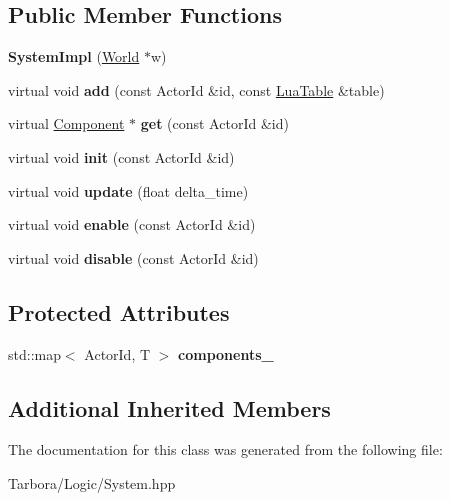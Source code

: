 \subsection*{Public Member Functions}
\begin{DoxyCompactItemize}
\item 
\mbox{\label{classTarbora_1_1SystemImpl_aa5a44080178fc08d40988860d53958e0}} 
{\bfseries System\+Impl} (\hyperlink{classTarbora_1_1World}{World} $\ast$w)
\item 
\mbox{\label{classTarbora_1_1SystemImpl_abfaf3411daed7227993a57de7c0cd634}} 
virtual void {\bfseries add} (const Actor\+Id \&id, const \hyperlink{classTarbora_1_1LuaTable}{Lua\+Table} \&table)
\item 
\mbox{\label{classTarbora_1_1SystemImpl_a96cdd0e80d8b53bfb8fa394ca168e849}} 
virtual \hyperlink{classTarbora_1_1Component}{Component} $\ast$ {\bfseries get} (const Actor\+Id \&id)
\item 
\mbox{\label{classTarbora_1_1SystemImpl_a453cc8490cfba14be97fd17a8f2866af}} 
virtual void {\bfseries init} (const Actor\+Id \&id)
\item 
\mbox{\label{classTarbora_1_1SystemImpl_a8bcfcd3cdce7e590179628c878bdac3a}} 
virtual void {\bfseries update} (float delta\+\_\+time)
\item 
\mbox{\label{classTarbora_1_1SystemImpl_ab44fa2ff9db7d5cb6541719590dce3ab}} 
virtual void {\bfseries enable} (const Actor\+Id \&id)
\item 
\mbox{\label{classTarbora_1_1SystemImpl_a7e3ff91142da0d31dd3203b89f00a181}} 
virtual void {\bfseries disable} (const Actor\+Id \&id)
\end{DoxyCompactItemize}
\subsection*{Protected Attributes}
\begin{DoxyCompactItemize}
\item 
\mbox{\label{classTarbora_1_1SystemImpl_a816816b142fe3cfeb76c1a71af30e4ba}} 
std\+::map$<$ Actor\+Id, T $>$ {\bfseries components\+\_\+}
\end{DoxyCompactItemize}
\subsection*{Additional Inherited Members}


The documentation for this class was generated from the following file\+:\begin{DoxyCompactItemize}
\item 
Tarbora/\+Logic/System.\+hpp\end{DoxyCompactItemize}
